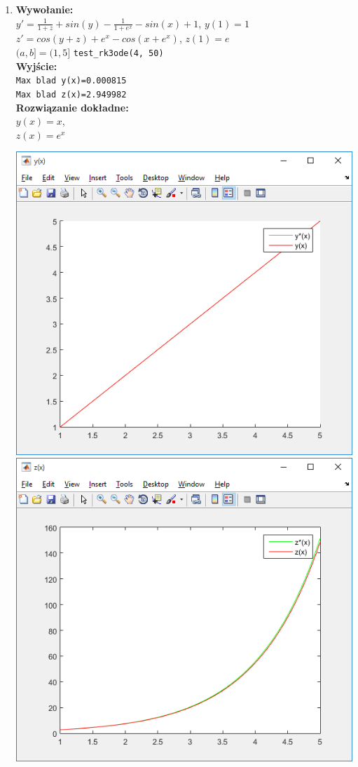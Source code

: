 \documentclass[]{article}
\begin{document}
\begin{enumerate}
\begin{center}
\end{center}
\newpage
\item \textbf{Wywołanie:}\\
$y'=\frac{1}{1+z}+sin(y)-\frac{1}{1+e^x}-sin(x)+1$,\hspace{7mm}      $y(1)=1$\\
$z'=cos(y+z)+e^x-cos(x+e^x)$,\hspace{13.5mm}   $z(1)=e$\\
$(a,b] = (1,5]$
\verb|test_rk3ode(4, 50)|
\\\textbf{Wyjście:}\\
\verb|Max blad y(x)=0.000815|\\
\verb|Max blad z(x)=2.949982|\\
\textbf{Rozwiązanie dokładne:}\\ $y(x)= x$,\\ $z(x)=e^{x}$
\begin{center}
	\includegraphics[scale=0.8]{y4.png}\\
	\includegraphics[scale=0.8]{z4.png}

\end{center}
\end{enumerate}
\end{document}
